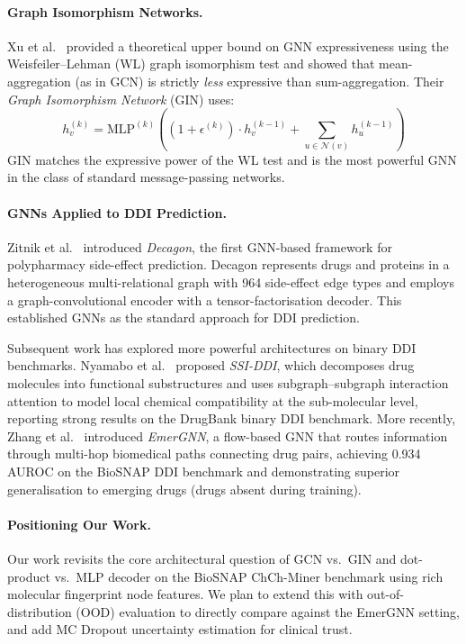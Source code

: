 \documentclass[11pt,a4paper]{article}
\begin{document}
\paragraph{Graph Isomorphism Networks.}
Xu et al.~\cite{xu2019} provided a theoretical upper bound on GNN
expressiveness using the Weisfeiler--Lehman (WL) graph isomorphism test
and showed that mean-aggregation (as in GCN) is strictly \emph{less}
expressive than sum-aggregation.
Their \emph{Graph Isomorphism Network} (GIN) uses:
\begin{equation}
  h_v^{(k)} = \text{MLP}^{(k)}\!\left((1 + \epsilon^{(k)}) \cdot h_v^{(k-1)}
    + \sum_{u \in \mathcal{N}(v)} h_u^{(k-1)}\right)
\end{equation}
GIN matches the expressive power of the WL test and is the most powerful
GNN in the class of standard message-passing networks.

\paragraph{GNNs Applied to DDI Prediction.}
Zitnik et al.~\cite{zitnik2018} introduced \emph{Decagon}, the first
GNN-based framework for polypharmacy side-effect prediction.
Decagon represents drugs and proteins in a heterogeneous multi-relational
graph with 964 side-effect edge types and employs a graph-convolutional
encoder with a tensor-factorisation decoder.
This established GNNs as the standard approach for DDI prediction.

Subsequent work has explored more powerful architectures on binary
DDI benchmarks.
Nyamabo et al.~\cite{nyamabo2021} proposed \emph{SSI-DDI}, which
decomposes drug molecules into functional substructures and uses
subgraph--subgraph interaction attention to model local chemical
compatibility at the sub-molecular level, reporting strong results on the
DrugBank binary DDI benchmark.
More recently, Zhang et al.~\cite{zhang2023} introduced \emph{EmerGNN},
a flow-based GNN that routes information through multi-hop biomedical
paths connecting drug pairs, achieving 0.934 AUROC on the BioSNAP DDI
benchmark and demonstrating superior generalisation to emerging drugs
(drugs absent during training).

\paragraph{Positioning Our Work.}
Our work revisits the core architectural question of GCN vs.\ GIN
and dot-product vs.\ MLP decoder on the BioSNAP ChCh-Miner benchmark using
rich molecular fingerprint node features.
We plan to extend this with out-of-distribution (OOD) evaluation to
directly compare against the EmerGNN setting, and add MC Dropout
uncertainty estimation for clinical trust.
\end{document}

